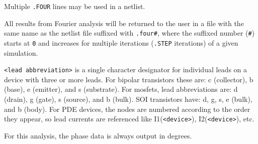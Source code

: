 \begin{Command}
\begin {Arguments}
\end{Arguments}

\comments
Multiple \texttt{.FOUR} lines may be used in a netlist.

All results from Fourier analysis will be returned to the user in a file with the
same name as the netlist file suffixed with \texttt{.four\#}, where the suffixed
number (\texttt{\#}) starts at \texttt{0} and increases for multiple
iterations (\texttt{.STEP} iterations) of a given simulation.

\texttt{<lead abbreviation>} is a single character designator for individual
leads on a device with three or more leads.  For bipolar transistors these are:
c (collector), b (base), e (emitter), and s (substrate).  For mosfets, lead
abbreviations are: d (drain), g (gate), s (source), and b (bulk).  SOI
transistors have: d, g, s, e (bulk), and b (body).  For PDE devices, the nodes
are numbered according to the order they appear, so lead currents are
referenced like I1(\texttt{<device>}), I2(\texttt{<device>}), etc.

For this analysis, the phase data is always output in degrees.

\end{Command}

